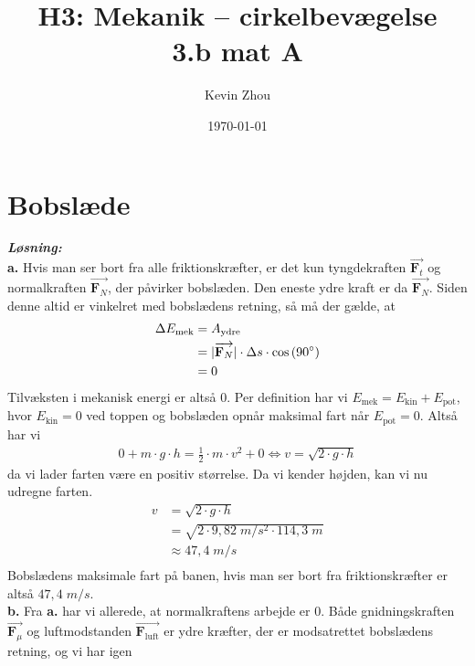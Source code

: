 \documentclass{report}
\title{H3: Mekanik – cirkelbevægelse\\
{\Large \textbf{3.b mat A}}}
\author{Kevin Zhou}
\date{\today}
\newcommand{\sol}{\setlength{\parindent}{0cm}\textbf{\textit{Løsning:}}\setlength{\parindent}{1cm}}
\begin{document}
\maketitle
\section*{Bobslæde}
\sol \\
\textbf{a.}
Hvis man ser bort fra alle friktionskræfter, er det kun tyngdekraften $\overrightarrow{\textbf{F}_t}$ og normalkraften $\overrightarrow{\textbf{F}_N}$, der påvirker bobslæden.
Den eneste ydre kraft er da $\overrightarrow{\textbf{F}_N}$.
Siden denne altid er vinkelret med bobslædens retning, så må der gælde, at
\begin{equation*}
\begin{split}
  \Delta E_{\text{mek} }&=A_{\text{ydre} }\\
  &=|\overrightarrow{\textbf{F}_N} | \cdot \Delta s \cdot \cos\left(90 \degree \right) \\
  &=0
\end{split}
\end{equation*}
Tilvæksten i mekanisk energi er altså 0. 
Per definition har vi $E _{\text{mek} }=E _{\text{kin} }+E _{\text{pot} }$, hvor $E _{\text{kin} }=0$ ved toppen og bobslæden opnår maksimal fart når $E _{\text{pot} }=0$. 
Altså har vi
\begin{equation*}
\begin{split}
  0+m \cdot g \cdot h=\frac{1}{2} \cdot m \cdot v^2 +0 \iff v=\sqrt{2 \cdot g \cdot h} 
\end{split}
\end{equation*}
da vi lader farten være en positiv størrelse.
Da vi kender højden, kan vi nu udregne farten.
\begin{equation*}
\begin{split}
  v&=\sqrt{2 \cdot g \cdot h} \\
  &=\sqrt{2 \cdot 9,82 \;\unit{m/s^2} \cdot 114,3 \;\unit{m} } \\
  &\approx 47,4 \;\unit{m/s} \\
\end{split}
\end{equation*}
Bobslædens maksimale fart på banen, hvis man ser bort fra friktionskræfter er altså $47,4 \;\unit{m/s} $.\\[1ex]
\textbf{b.}
Fra \textbf{a.} har vi allerede, at normalkraftens arbejde er 0.
Både gnidningskraften $\overrightarrow{\textbf{F}_{\mu}} $ og luftmodstanden $\overrightarrow{\textbf{F}_{\text{luft}}}$ er ydre kræfter, der er modsatrettet bobslædens retning, og vi har igen
\end{document}
